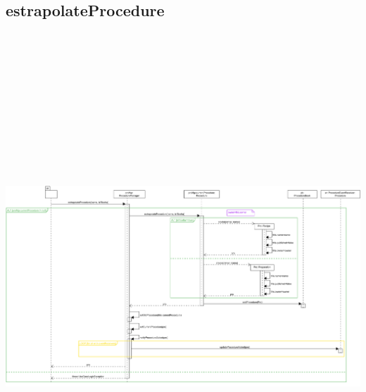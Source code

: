 \subsection{estrapolateProcedure}
\includegraphics[max width=\textwidth, max height=190mm]{../resources/img/GRP/DSD/op7d.png}
\endgroup
\endgroup